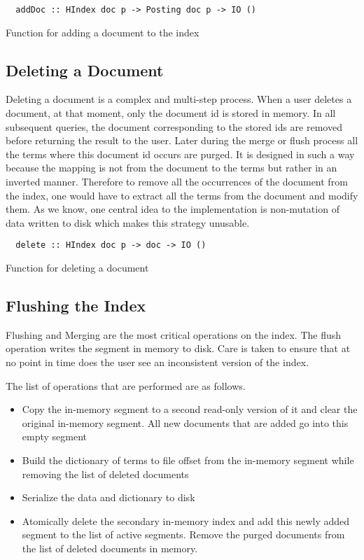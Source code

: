 \begin{listing}
\begin{verbatim}
  addDoc :: HIndex doc p -> Posting doc p -> IO ()
\end{verbatim}
\caption{Function for adding a document to the index}
\end{listing}

\subsection{Deleting a Document}
Deleting a document is a complex and multi-step process. When a user deletes a document, at that moment, only the document id is stored in memory.
In all subsequent queries, the document corresponding to the stored ids are removed before returning the result to the user.
Later during the merge or flush process all the terms where this document id occurs are purged.
It is designed in such a way because the mapping is not from the document to the terms but rather in an inverted manner.
Therefore to remove all the occurrences of the document from the index, one would have to extract all the terms from the document and modify them.
As we know, one central idea to the implementation is non-mutation of data written to disk which makes this strategy unusable.

\begin{listing}
\begin{verbatim}
  delete :: HIndex doc p -> doc -> IO ()
\end{verbatim}
\caption{Function for deleting a document}
\end{listing}

\subsection{Flushing the Index}
Flushing and Merging are the most critical operations on the index.
The flush operation writes the segment in memory to disk. Care is taken to ensure that at no point in time does the user see an inconsistent version of the index.

The list of operations that are performed are as follows.
\begin{itemize}
\item Copy the in-memory segment to a second read-only version of it and clear the original in-memory segment.
All new documents that are added go into this empty segment
\item Build the dictionary of terms to file offset from the in-memory segment while removing the list of deleted documents
\item Serialize the data and dictionary to disk
\item Atomically delete the secondary in-memory index and add this newly added segment to the list of active segments.
Remove the purged documents from the list of deleted documents in memory.
\end{itemize}

